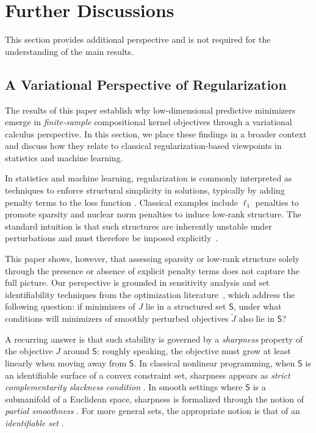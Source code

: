 \documentclass[sn-mathphys-num]{sn-jnl}%
\numberwithin{equation}{section}
\theoremstyle{thmstyleone}%
\theoremstyle{thmstyletwo}%
\theoremstyle{thmstylethree}%
\begin{document}
\section{Further Discussions}
\label{sec:further-discussions}
\indent\indent
This section provides additional perspective and is not required for the
understanding of the main results.


\subsection{A Variational Perspective of Regularization} 
\label{sec:variational-perspective-of-regularization}
\indent\indent
The results of this paper establish why low-dimensional predictive minimizers emerge in \emph{finite-sample} compositional kernel objectives through a variational calculus perspective. In this section, we place these findings in a broader context and discuss how they relate to classical regularization-based viewpoints in statistics and machine learning.


In statistics and machine learning, regularization is commonly interpreted as techniques to enforce structural simplicity in solutions, typically by adding penalty terms to the loss function \cite{HastieTiFr09}. Classical examples include $\ell_1$ penalties to promote sparsity and nuclear norm penalties to induce low-rank structure. The standard intuition is that such structures are inherently unstable under perturbations and must therefore be imposed explicitly~\cite{HastieTiFr09}.

This paper shows, however, that assessing sparsity or low-rank structure solely through the presence or absence of explicit penalty terms does not capture the full picture. Our perspective is grounded in sensitivity analysis and set identifiability techniques from the optimization literature~\cite{Wright93,Lewis02,HareLe07,Drusvyatskiys13,DrusvyatskiyLe14}, which address the following question: if  minimizers of $J$ lie in a structured set $\mathsf{S}$, under what conditions will minimizers of smoothly perturbed objectives $\tilde{J}$ also lie in $\mathsf{S}$?

A recurring answer is that such stability is governed by a \emph{sharpness} property of the objective $J$ around $\mathsf{S}$: roughly speaking, the objective must grow at least linearly when moving away from $\mathsf{S}$. In classical nonlinear programming, when $\mathsf{S}$ is an identifiable surface of a convex constraint set, sharpness appears as \emph{strict complementarity slackness condition} \cite{Wright93}. In smooth settings where $\mathsf{S}$ is a submanifold of a Euclidean space, sharpness is formalized through the notion of \emph{partial smoothness} \cite{Lewis02}. For more general sets, the appropriate notion is that of an \emph{identifiable set} \cite{Drusvyatskiys13,DrusvyatskiyLe14}.
\end{document}
